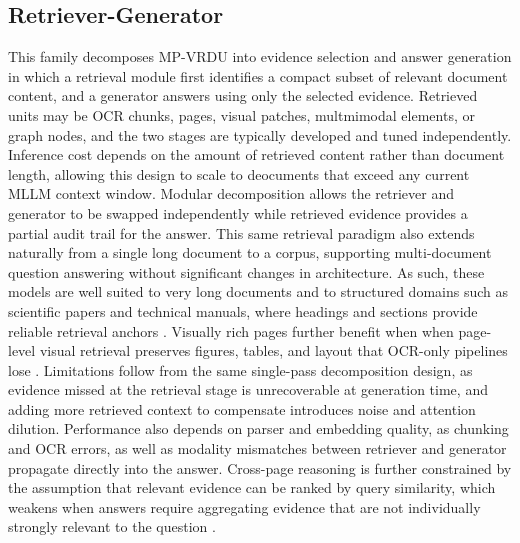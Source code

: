 \documentclass[11pt]{article}
\begin{document}
\subsection{Retriever-Generator}

This family decomposes MP-VRDU into evidence selection and answer generation in which a retrieval module first identifies a compact subset of relevant document content, and a generator answers using only the selected evidence. Retrieved units may be OCR chunks, pages, visual patches, multmimodal elements, or graph nodes, and the two stages are typically developed and tuned independently. Inference cost depends on the amount of retrieved content rather than document length, allowing this design to scale to deocuments that exceed any current MLLM context window. Modular decomposition allows the retriever and generator to be swapped independently while retrieved evidence provides a partial audit trail for the answer. This same retrieval paradigm also extends naturally from a single long document to a corpus, supporting multi-document question answering without significant changes in architecture. As such, these models are well suited to very long documents and to structured domains such as scientific papers and technical manuals, where headings and sections provide reliable retrieval anchors \cite{cho2024m3docrag, shin2025multidocfusion}. Visually rich pages further benefit when when page-level visual retrieval preserves figures, tables, and layout that OCR-only pipelines lose \cite{tanaka2025vdocrag, xie2024wukong}. Limitations follow from the same single-pass decomposition design, as evidence missed at the retrieval stage is unrecoverable at generation time, and adding more retrieved context to compensate introduces noise and attention dilution. Performance also depends on parser and embedding quality, as chunking and OCR errors, as well as modality mismatches between retriever and generator propagate directly into the answer. Cross-page reasoning is further constrained by the assumption that relevant evidence can be ranked by query similarity, which weakens when answers require aggregating evidence that are not individually strongly relevant to the question \cite{wang2024knowledge, wu2025molorag}.
\end{document}
